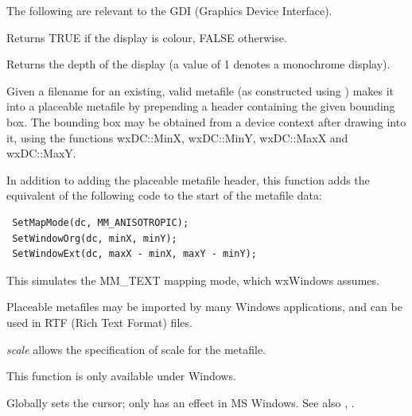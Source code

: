 The following are relevant to the GDI (Graphics Device Interface).



Returns TRUE if the display is colour, FALSE otherwise.



Returns the depth of the display (a value of 1 denotes a monochrome display).

\label{wxmakemetafileplaceable}


Given a filename for an existing, valid metafile (as constructed using )
makes it into a placeable metafile by prepending a header containing the given
bounding box. The bounding box may be obtained from a device context after drawing
into it, using the functions wxDC::MinX, wxDC::MinY, wxDC::MaxX and wxDC::MaxY.

In addition to adding the placeable metafile header, this function adds
the equivalent of the following code to the start of the metafile data:

\begin{verbatim}
 SetMapMode(dc, MM_ANISOTROPIC);
 SetWindowOrg(dc, minX, minY);
 SetWindowExt(dc, maxX - minX, maxY - minY);
\end{verbatim}

This simulates the MM\_TEXT mapping mode, which wxWindows assumes.

Placeable metafiles may be imported by many Windows applications, and can be
used in RTF (Rich Text Format) files.

{\it scale} allows the specification of scale for the metafile.

This function is only available under Windows.

\label{wxsetcursor}


Globally sets the cursor; only has an effect in MS Windows.
See also , .

